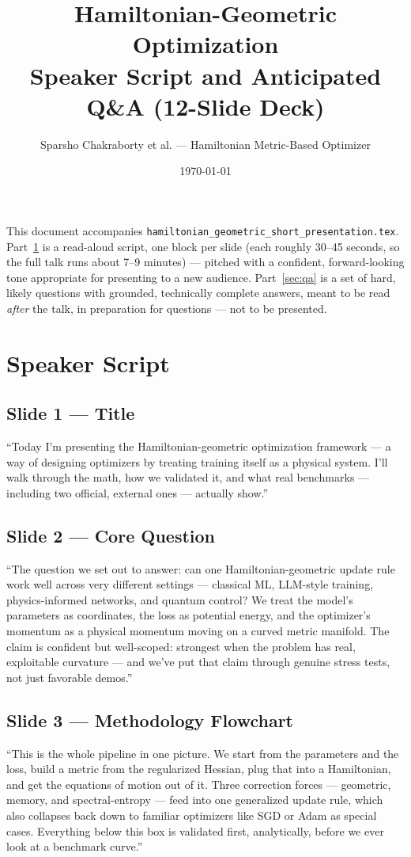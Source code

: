 \documentclass[11pt]{article}
\title{\color{hgpurple}\textbf{Hamiltonian-Geometric Optimization}\\[2pt]
  \large Speaker Script and Anticipated Q\&A (12-Slide Deck)}
\author{Sparsho Chakraborty et al. --- Hamiltonian Metric-Based Optimizer}
\date{\today}
\begin{document}
\maketitle

\noindent This document accompanies \texttt{hamiltonian\_geometric\_short\_presentation.tex}.
Part~\ref{sec:script} is a read-aloud script, one block per slide (each roughly 30--45 seconds,
so the full talk runs about 7--9 minutes) --- pitched with a confident, forward-looking tone
appropriate for presenting to a new audience. Part~\ref{sec:qa} is a set of hard, likely
questions with grounded, technically complete answers, meant to be read \emph{after} the talk,
in preparation for questions --- not to be presented.

\section{Speaker Script}
\label{sec:script}

\subsection*{Slide 1 --- Title}
``Today I'm presenting the Hamiltonian-geometric optimization framework --- a way of designing
optimizers by treating training itself as a physical system. I'll walk through the math, how we
validated it, and what real benchmarks --- including two official, external ones --- actually
show.''

\subsection*{Slide 2 --- Core Question}
``The question we set out to answer: can one Hamiltonian-geometric update rule work well across
very different settings --- classical ML, LLM-style training, physics-informed networks, and
quantum control? We treat the model's parameters as coordinates, the loss as potential energy,
and the optimizer's momentum as a physical momentum moving on a curved metric manifold. The
claim is confident but well-scoped: strongest when the problem has real, exploitable curvature ---
and we've put that claim through genuine stress tests, not just favorable demos.''

\subsection*{Slide 3 --- Methodology Flowchart}
``This is the whole pipeline in one picture. We start from the parameters and the loss, build a
metric from the regularized Hessian, plug that into a Hamiltonian, and get the equations of
motion out of it. Three correction forces --- geometric, memory, and spectral-entropy --- feed
into one generalized update rule, which also collapses back down to familiar optimizers like SGD
or Adam as special cases. Everything below this box is validated first, analytically, before we
ever look at a benchmark curve.''
\end{document}
